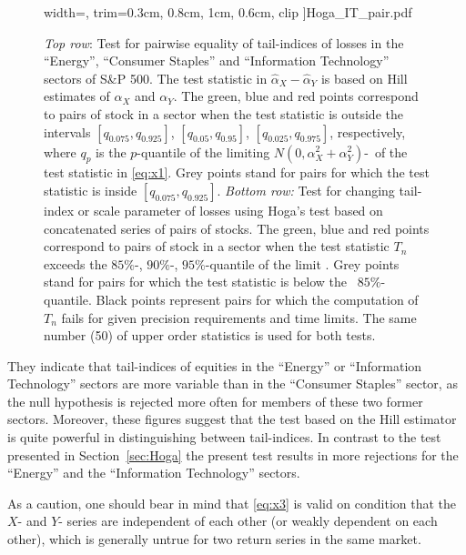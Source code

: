 \begin{figure}[htb!]
\begin{minipage}{0.33\linewidth}
      width=\textwidth,
      trim={0.3cm, 0.8cm, 1cm, 0.6cm}, clip
    ]{Hoga_IT_pair.pdf}
  \end{minipage}
  \caption{{\em Top row}: Test for pairwise equality of tail-indices
    of losses in the  ``Energy'', ``Consumer Staples'' and
    ``Information Technology'' 
    sectors of S\&P 500. The test statistic in $\hat\alpha_X-\hat \alpha_Y$ is based
    on Hill estimates 
    of $\alpha_X$ and $\alpha_Y$. 
    The green, blue and red points correspond to pairs of stock in a sector
    when the test statistic is outside the intervals $[q_{0.075},q_{0.925}]$,
    $[q_{0.05},q_{0.95}]$,  $[q_{0.025},q_{0.975}]$, respectively, where
    $q_p$ is the $p$-quantile of the limiting 
    $N(0,\alpha_X^2+\alpha_Y^2)$-\ds\ of the test statistic in
    \eqref{eq:x1}. Grey points stand for pairs for which the test
    statistic is inside $[q_{0.075},q_{0.925}]$. 
    {\em Bottom row:} Test for changing tail-index or scale parameter
    of losses
    using Hoga's test based on concatenated series of pairs of
    stocks. The green, blue and red points
    correspond to pairs of stock in a sector 
    when the test statistic $T_n$ exceeds the $85\%$-, $90\%$-,
    $95\%$-quantile of the limit \ds .
  Grey points stand for pairs for which the test statistic is below
  the \asy\ $85\%$-quantile. Black points represent 
    pairs for which the computation of $T_n$ fails for given precision  
    requirements and time limits.
    The same number (50) of upper order statistics is used for both tests.}
  \label{fig:PairTest} 
\end{figure}
They indicate that tail-indices of equities in the
``Energy'' or ``Information Technology'' sectors are more variable 
than in the ``Consumer Staples'' sector, as the null
hypothesis is rejected more often for members of these two former sectors.
Moreover, these figures suggest that the test based on the Hill estimator
is quite powerful in distinguishing between tail-indices. In contrast to the test presented in Section~\ref{sec:Hoga}
the present test results in  more rejections for the ``Energy'' and the
``Information Technology'' sectors.
\par
As a caution, one should bear in mind that 
\eqref{eq:x3} is valid on condition that the $X$- and $Y$-
series are independent of each other (or weakly dependent on each other), which is generally untrue for
two return series in the same market.

